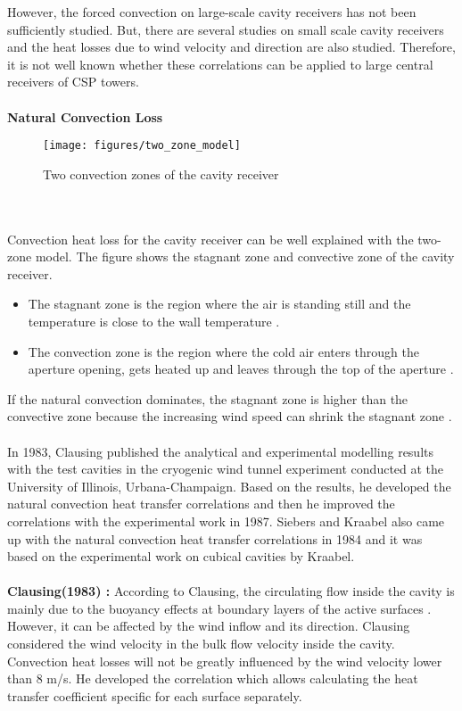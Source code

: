 However, the forced convection on large-scale cavity receivers has not been sufficiently studied. But, there are several studies on small scale cavity receivers \cite{Prakash.2009} \cite{Taumoefolau.2004} and the heat losses due to wind velocity and direction \cite{Ma.1993} are also studied. Therefore, it is not well known whether these correlations can be applied to large central receivers of CSP towers. \\\\
\textbf{Natural Convection Loss}
\begin{figure}[h]
	\texttt{[image: figures/two\_zone\_model]}
	\centering
	\caption{Two convection zones of the cavity receiver \cite{Flesch.2015} }
\end{figure}\\\\
\noindent Convection heat loss for the cavity receiver can be well explained with the two-zone model. The figure shows the stagnant zone and convective zone of the cavity receiver.
\begin{itemize}
      \item The stagnant zone is the region where the air is standing still and the temperature is close to the wall temperature \cite{Flesch.2015}.
      \item The convection zone is the region where the cold air enters through the aperture opening, gets heated up and leaves through the top of the aperture \cite{Flesch.2015}.
\end{itemize}  
If the natural convection dominates, the stagnant zone is higher than the convective zone because the increasing wind speed can shrink the stagnant zone \cite{Flesch.2015}.\\\\
In 1983, Clausing \cite{Clausing.1983} published the analytical and experimental modelling results with the test cavities in the cryogenic wind tunnel experiment conducted at the University of Illinois, Urbana-Champaign. Based on the results, he developed the natural convection heat transfer correlations and then he improved the correlations with the experimental work in 1987. Siebers and Kraabel \cite{Siebers.1984} also came up with the natural convection heat transfer correlations in 1984 and it was based on the experimental work on cubical cavities by Kraabel. \\\\
\textbf{Clausing(1983) \cite{Clausing.1983}:}
According to Clausing, the circulating flow inside the cavity is mainly due to the buoyancy effects at boundary layers of the active surfaces \cite{Feierabend.2010}. However, it can be affected by the wind inflow and its direction. Clausing considered the wind velocity in the bulk flow velocity inside the cavity.  Convection heat losses will not be greatly influenced by the wind velocity lower than 8 m/s.  He developed the correlation which allows calculating the heat transfer coefficient specific for each surface separately. \\\\
